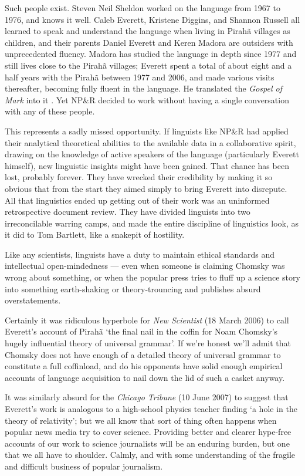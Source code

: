 \documentclass[output=paper,colorlinks,citecolor=brown
]{langscibook}
\begin{document}
Such people exist. Steven Neil Sheldon worked on the language from
1967 to 1976, and knows it well. Caleb Everett, Kristene Diggins,
and Shannon Russell all learned to speak and understand the language
when living in Pirah{\~a} villages as children, and their parents
Daniel Everett and Keren Madora are outsiders with unprecedented
fluency. Madora has studied the language in depth since 1977 and
still lives close to the Pirah{\~a} villages; Everett spent a total
of about eight and a half years with the Pirah{\~a} between 1977
and 2006, and made various visits thereafter, becoming fully fluent
in the language. He translated the \textit{Gospel of Mark} into it
\citep{Everett86Mark}. Yet NP\&R decided to work without having a
single conversation with any of these people.

This represents a sadly missed opportunity. If linguists like NP\&R
had applied their analytical theoretical abilities to the available
data in a collaborative spirit, drawing on the knowledge of active
speakers of the language (particularly Everett himself), new linguistic
insights might have been gained. That chance has been lost, probably
forever. They have wrecked their credibility by making it so obvious
that from the start they aimed simply to bring Everett into disrepute.
All that linguistics ended up getting out of their work was an
uninformed retrospective document review. They have divided linguists
into two irreconcilable warring camps, and made the entire discipline
of linguistics look, as it did to Tom Bartlett, like a snakepit of
hostility.

Like any scientists, linguists have a duty to maintain ethical
standards and intellectual open-mindedness --- even when someone is
claiming Chomsky was wrong about something, or when the popular
press tries to fluff up a science story into something earth-shaking
or theory-trouncing and publishes absurd overstatements.

Certainly it was ridiculous hyperbole for
\textit{New Scientist} (18 March 2006)
to call Everett's account of Pirah{\~a} `the final nail in the
coffin for Noam Chomsky's hugely influential theory of universal
grammar'. If we're honest we'll admit that Chomsky does not have
enough of a detailed theory of universal grammar to constitute a full
coffinload, and do his opponents have solid enough empirical accounts
of language acquisition to nail down the lid of such a casket anyway.

It was similarly absurd for the
\textit{Chicago Tribune} (10 June 2007)
to suggest that Everett's work is analogous to a high-school physics
teacher finding `a hole in the theory of relativity'; but we all know
that sort of thing often happens when popular news media try to cover
science. Providing better and clearer hype-free accounts of our work
to science journalists will be an enduring burden, but one that we
all have to shoulder. Calmly, and with some understanding of the
fragile and difficult business of popular journalism.
\end{document}
